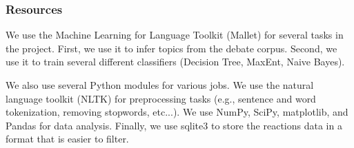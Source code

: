 \subsubsection{Resources}

We use the Machine Learning for Language Toolkit (Mallet) for several tasks in the project.
First, we use it to infer topics from the debate corpus.
Second, we use it to train several different classifiers (Decision Tree, MaxEnt, Naive Bayes).

We also use several Python modules for various jobs.
We use the natural language toolkit (NLTK) for preprocessing tasks (e.g., sentence and word tokenization, removing stopwords, etc...).
We use NumPy, SciPy, matplotlib, and Pandas for data analysis.
Finally, we use sqlite3 to store the reactions data in a format that is easier to filter.
